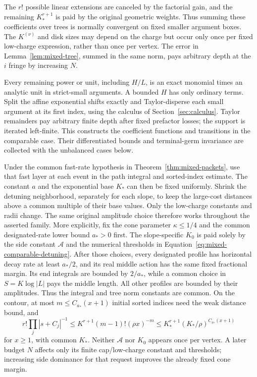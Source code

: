 The $r!$ possible linear extensions are canceled by the factorial
gain, and the remaining $K_*^{r+1}$ is paid by the original
geometric weights. Thus summing these coefficients over trees is
normally convergent on fixed smaller argument boxes. The
$K^{(\nu)}$ and disk sizes may depend on the charge but occur only
once per fixed low-charge expression, rather than once per vertex.
The error in Lemma~\ref{lem:mixed-tree}, summed in the same norm,
pays arbitrary depth at the $i$ fringe by increasing $N$.

Every remaining power or unit, including $H/L$, is an exact
monomial times an analytic unit in strict-small arguments. A
bounded $H$ has only ordinary terms. Split the affine exponential
shifts exactly and Taylor-disperse each small argument at its first
index, using the calculus of Section~\ref{sec:calculus}.
Taylor remainders pay arbitrary finite depth after fixed prefactor
losses; the support is iterated left-finite. This constructs the
coefficient functions and transitions in the comparable case. Their
differentiated bounds and terminal-germ invariance are collected with
the unbalanced cases below.

Under the common fast-rate hypothesis in
Theorem~\ref{thm:mixed-packets}, use that fast layer at each event
in the path integral and sorted-index estimate. The constant $a$
and the exponential base $K_*$ can then be fixed uniformly. Shrink
the detuning neighborhood, separately for each slope, to keep the
large-cost distances above a common multiple of their base values.
Only the low-charge constants and radii change. The same original
amplitude choice therefore works throughout the asserted family.
More explicitly, fix the cone parameter $\kappa\leq1/4$ and the
common designated-rate lower bound $a_*>0$ first. The slope-specific
$K_0$ is paid solely by the side constant $\mathcal A$ and the
numerical thresholds in Equation~\eqref{eq:mixed-comparable-detuning}.
After those choices, every designated profile has horizontal decay
rate at least $a_*/2$, and its real middle action has the same fixed
fractional margin. Its end integrals are bounded by $2/a_*$, while
a common choice in $S=K\log|L|$ pays the middle length. All other
profiles are bounded by their amplitudes. Thus the integral and
tree norm constants are common. On the contour, at most
$m\leq C_{a_*}(x+1)$ initial sorted indices need the weak distance
bound, and
\[
 r!\prod_j|s+C_j|^{-1}
 \leq K^{r+1}(m-1)!(\rho x)^{-m}
 \leq K_*^{r+1}(K_*/\rho)^{C_{a_*}(x+1)}
\]
for $x\geq1$, with common $K_*$. Neither $\mathcal A$ nor $K_0$
appears once per vertex. A later budget $N$ affects only its finite
cap/low-charge constant and thresholds; increasing side dominance
for that request improves the already fixed cone margin.

